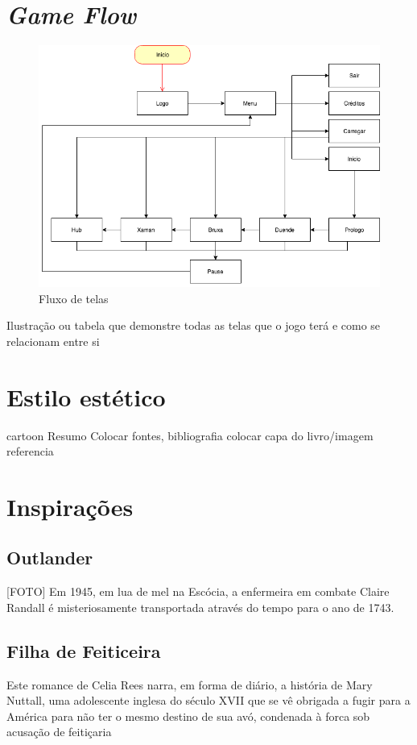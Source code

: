 \section{\textit{Game Flow}}
\begin{figure}[htb]
	\caption{\label{fig_grafico}Fluxo de telas}
	\begin{center}
	    \includegraphics[scale=0.5]{imagens/Flow.png}
	\end{center}
\end{figure}
Ilustração ou tabela que demonstre todas as telas que o jogo terá e como se relacionam entre si

\section{Estilo estético}

cartoon Resumo
Colocar fontes, bibliografia colocar capa do livro/imagem referencia

\section{Inspirações}
\subsection{Outlander}
[FOTO]
Em 1945, em lua de mel na Escócia, a enfermeira em combate Claire Randall é misteriosamente transportada através do tempo para o ano de 1743.

\subsection{Filha de Feiticeira}
Este romance de Celia Rees narra, em forma de diário, a história de Mary Nuttall, uma adolescente inglesa do século XVII que se vê obrigada a fugir para a América para não ter o mesmo destino de sua avó, condenada à forca sob acusação de feitiçaria

